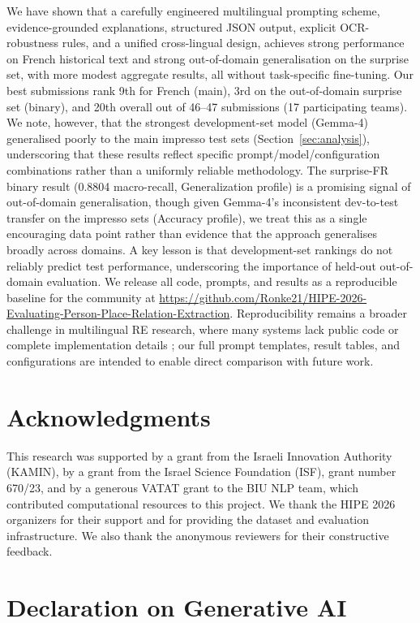 \documentclass[
]{ceurart}
\theoremstyle{definition}
\begin{document}
We have shown that a carefully engineered multilingual prompting scheme, evidence-grounded explanations, structured JSON output, explicit OCR-robustness rules, and a unified cross-lingual design, achieves strong performance on French historical text and strong out-of-domain generalisation on the surprise set, with more modest aggregate results, all without task-specific fine-tuning.
Our best submissions rank 9th for French (main), 3rd on the out-of-domain surprise set (binary), and 20th overall out of 46--47 submissions (17 participating teams).
We note, however, that the strongest development-set model (Gemma-4) generalised poorly to the main impresso test sets (Section~\ref{sec:analysis}), underscoring that these results reflect specific prompt/model/configuration combinations rather than a uniformly reliable methodology.
The surprise-FR binary result (0.8804 macro-recall, Generalization profile) is a promising signal of out-of-domain generalisation, though given Gemma-4's inconsistent dev-to-test transfer on the impresso sets (Accuracy profile), we treat this as a single encouraging data point rather than evidence that the approach generalises broadly across domains.
A key lesson is that development-set rankings do not reliably predict test performance, underscoring the importance of held-out out-of-domain evaluation.
We release all code, prompts, and results as a reproducible baseline for the community at \url{https://github.com/Ronke21/HIPE-2026-Evaluating-Person-Place-Relation-Extraction}.
Reproducibility remains a broader challenge in multilingual RE research, where many systems lack public code or complete implementation details \citep{ali2025multilingual}; our full prompt templates, result tables, and configurations are intended to enable direct comparison with future work.

\section*{Acknowledgments}

This research was supported by a grant from the Israeli Innovation Authority (KAMIN), by a grant from the Israel Science Foundation (ISF), grant number 670/23, and by a generous VATAT grant to the BIU NLP team, which contributed computational resources to this project. We thank the HIPE 2026 organizers for their support and for providing the dataset and evaluation infrastructure. We also thank the anonymous reviewers for their constructive feedback.


\section*{Declaration on Generative AI}
\end{document}
